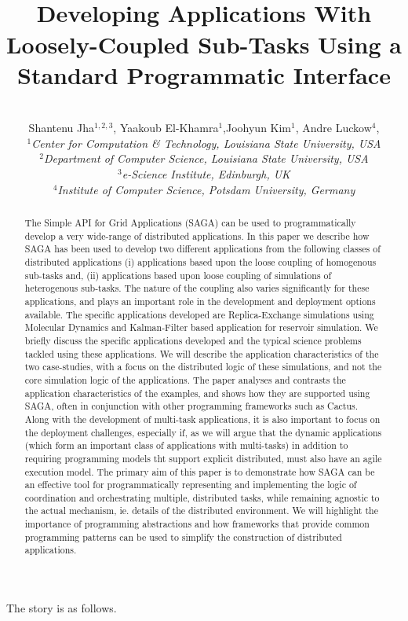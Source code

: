 \documentclass[conference,final]{IEEEtran}
\title{
  ~\\[-3em]
  Developing Applications With Loosely-Coupled Sub-Tasks Using a
  Standard Programmatic Interface}
\author{
    ~\\[-2em]
    Shantenu Jha$^{1,2,3}$, Yaakoub El-Khamra$^{1}$,Joohyun Kim$^{1}$,
    Andre Luckow$^{4}$, \\
    \small{\emph{$^{1}$Center for Computation \& Technology, Louisiana State University, USA}}\\
    \small{\emph{$^{2}$Department of Computer Science, Louisiana State
        University, USA}}\\
    \small{\emph{$^{3}$e-Science Institute, Edinburgh, UK}}\\
    \small{\emph{$^{4}$Institute of Computer Science, Potsdam University, Germany}}\\
  }
\begin{document}
 


\maketitle    

\begin{abstract}
  The Simple API for Grid Applications (SAGA) can be used to
  programmatically develop a very wide-range of distributed
  applications.  In this paper we describe how SAGA has been used to
  develop two different applications from the following classes of
  distributed applications (i) applications based upon the loose
  coupling of homogenous sub-tasks and, (ii) applications based upon
  loose coupling of simulations of heterogenous sub-tasks.  The nature
  of the coupling also varies significantly for these applications,
  and plays an important role in the development and deployment
  options available.  The specific applications developed are
  Replica-Exchange simulations using Molecular Dynamics and
  Kalman-Filter based application for reservoir simulation.  We
  briefly discuss the specific applications developed and the typical
  science problems tackled using these applications.  We will describe
  the application characteristics of the two case-studies, with a
  focus on the distributed logic of these simulations, and not the
  core simulation logic of the applications.  The paper analyses and
  contrasts the application characteristics of the examples, and shows
  how they are supported using SAGA, often in conjunction with other
  programming frameworks such as Cactus. Along with the development of
  multi-task applications, it is also important to focus on the
  deployment challenges, especially if, as we will argue that the
  dynamic applications (which form an important class of applications
  with multi-tasks) in addition to requiring programming models tht
  support explicit distributed, must also have an agile execution
  model.  The primary aim of this paper is to demonstrate how SAGA can
  be an effective tool for programmatically representing and
  implementing the logic of coordination and orchestrating multiple,
  distributed tasks, while remaining agnostic to the actual mechanism,
  ie. details of the distributed environment. We will highlight the
  importance of programming abstractions and how frameworks that
  provide common programming patterns can be used to simplify the
  construction of distributed applications.
\end{abstract}

The story is as follows. 
\end{document}
